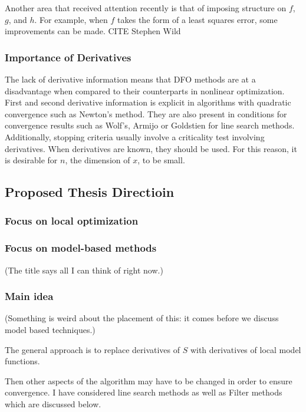 \documentclass{article}
\begin{document}
Another area that received attention recently is that of imposing structure on $f$, $g$, and $h$.
For example, when $f$ takes the form of a least squares error, some improvements can be made. CITE Stephen Wild




\subsubsection{Importance of Derivatives}

The lack of derivative information means that DFO methods are at a disadvantage when compared to their counterparts in nonlinear optimization.
First and second derivative information is explicit in algorithms with quadratic convergence such as Newton's method.
They are also present in conditions for convergence results such as Wolf's, Armijo or Goldstien for line search methods.
Additionally, stopping criteria usually involve a criticality test involving derivatives.
When derivatives are known, they should be used.
For this reason, it is desirable for $n$, the dimension of $x$, to be small.


\subsection{Proposed Thesis Directioin}
\subsubsection{Focus on local optimization}
\subsubsection{Focus on model-based methods}

(The title says all I can think of right now.)

\subsubsection{Main idea}

(Something is weird about the placement of this: it comes before we discuss model based techniques.)

The general approach is to replace derivatives of $S$ with derivatives of local model functions.

Then other aspects of the algorithm may have to be changed in order to ensure convergence.
I have considered line search methods as well as Filter methods which are discussed below.
\end{document}
